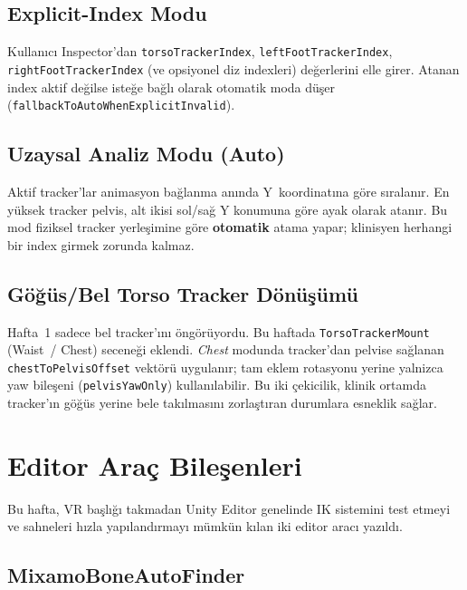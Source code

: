 \documentclass[11pt,a4paper]{article}
\begin{document}
\subsection{Explicit-Index Modu}

Kullan{\i}c{\i} Inspector'dan
\texttt{torsoTrackerIndex}, \texttt{leftFootTrackerIndex},
\texttt{rightFootTrackerIndex} (ve opsiyonel diz indexleri)
de\u{g}erlerini elle girer. Atanan index aktif de\u{g}ilse
isteğe ba\u{g}l{\i} olarak otomatik moda d\"u\c{s}er
(\texttt{fallbackToAutoWhenExplicitInvalid}).

\subsection{Uzaysal Analiz Modu (Auto)}

Aktif tracker'lar animasyon bağlanma an{\i}nda Y~koordinat{\i}na
g\"ore s{\i}ralan{\i}r. En y\"uksek tracker pelvis, alt ikisi
sol/sa\u{g} Y konumuna g\"ore ayak olarak atanır. Bu mod
fiziksel tracker yerle\c{s}imine g\"ore \textbf{otomatik} atama
yapar; klinisyen herhangi bir index girmek zorunda kalmaz.

\subsection{G\"o\u{g}\"us/Bel Torso Tracker D\"on\"u\c{s}\"um\"u}

Hafta~1 sadece bel tracker'{\i}n{\i} \"ong\"or\"uyordu. Bu haftada
\texttt{TorsoTrackerMount} (Waist~/ Chest) seceneği eklendi.
\textit{Chest} modunda tracker'dan pelvise sa\u{g}lanan
\texttt{chestToPelvisOffset} vekt\"or\"u uygulan{\i}r;
tam eklem rotasyonu yerine yalnizca yaw bile\c{s}eni
(\texttt{pelvisYawOnly}) kullan{\i}labilir. Bu iki \c{c}ekicilik,
klinik ortamda tracker'{\i}n g\"o\u{g}\"us yerine bele tak{\i}lmas{\i}n{\i}
zorla\c{s}t{\i}ran durumlara esneklik sa\u{g}lar.

\section{Editor Araç Bile\c{s}enleri}
\label{sec:editor}

Bu hafta, VR ba\c{s}l{\i}\u{g}{\i} takmadan Unity Editor genelinde
IK sistemini test etmeyi ve sahneleri h{\i}zla yap{\i}land{\i}rmay{\i}
m\"umk\"un k{\i}lan iki editor arac{\i} yaz{\i}ld{\i}.

\subsection{MixamoBoneAutoFinder}
\end{document}
